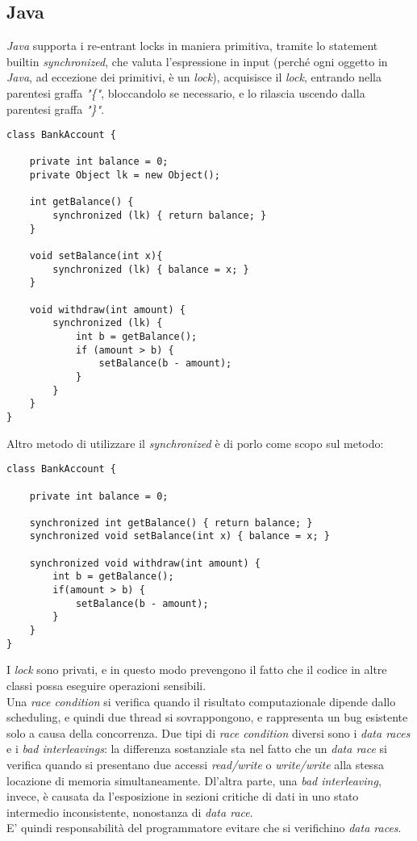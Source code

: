 \subsection{Java}
\textit{Java} supporta i re-entrant locks in maniera primitiva, tramite lo statement builtin \textit{synchronized}, che valuta l'espressione in input (perché ogni oggetto in \textit{Java}, ad eccezione dei primitivi, è un \textit{lock}), acquisisce il \textit{lock}, entrando nella parentesi graffa \textit{"\{"}, bloccandolo se necessario, e lo rilascia uscendo dalla parentesi graffa \textit{"\}"}.
\begin{lstlisting}
class BankAccount {

	private int balance = 0;
	private Object lk = new Object();

	int getBalance() {
		synchronized (lk) { return balance; }
	}

	void setBalance(int x){
		synchronized (lk) { balance = x; }
	}

	void withdraw(int amount) {
		synchronized (lk) {
			int b = getBalance();
			if (amount > b) {
				setBalance(b - amount);
			}
		}
	}
}
\end{lstlisting}

\newpage
Altro metodo di utilizzare il \textit{synchronized} è di porlo come scopo sul metodo:
\begin{lstlisting}
class BankAccount {

	private int balance = 0;

	synchronized int getBalance() { return balance; }
	synchronized void setBalance(int x) { balance = x; }

	synchronized void withdraw(int amount) {
		int b = getBalance();
		if(amount > b) {
			setBalance(b - amount);
		}
	}
}
\end{lstlisting}
I \textit{lock} sono privati, e in questo modo prevengono il fatto che il codice in altre classi possa eseguire operazioni sensibili. \\

Una \textit{race condition} si verifica quando il risultato computazionale dipende dallo scheduling, e quindi due thread si sovrappongono, e rappresenta un bug esistente solo a causa della concorrenza.
Due tipi di \textit{race condition} diversi sono i \textit{data races} e i \textit{bad interleavings}: la differenza sostanziale sta nel fatto che un \textit{data race} si verifica quando si presentano due accessi \textit{read/write} o \textit{write/write} alla stessa locazione di memoria simultaneamente. Dl'altra parte, una \textit{bad interleaving}, invece, è causata da l'esposizione in sezioni critiche di dati in uno stato intermedio inconsistente, nonostanza di \textit{data race}. \\
E' quindi responsabilità del programmatore evitare che si verifichino \textit{data races}. \\

